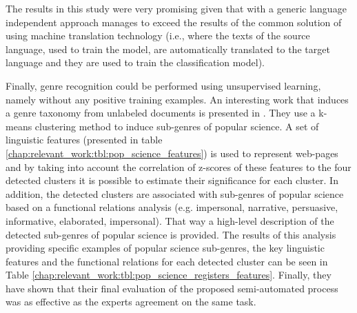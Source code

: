 \begin{itemize}
\begin{end}
The results in this study were very promising given that with a generic language independent approach manages to exceed the results of the common solution of using machine translation technology (i.e., where the texts of the  source language, used to train the model, are automatically translated to the target language and they are used to train the classification model).

Finally, genre recognition could be performed using unsupervised learning, namely without any positive training examples. An interesting work that induces a genre taxonomy from unlabeled documents is presented in \parencite{lieungnapar2017genre}. They use a k-means clustering method to induce sub-genres of popular science. A set of linguistic features (presented in table \ref{chap:relevant_work:tbl:pop_science_features}) is used to represent web-pages and by taking into account the correlation of z-scores of these features to the four detected clusters it is possible to estimate their significance for each cluster. In addition, the detected clusters are associated with sub-genres of popular science based on a functional relations analysis (e.g. impersonal, narrative, persuasive, informative, elaborated, impersonal). That way a high-level description of the detected sub-genres of popular science is provided. The results of this analysis providing specific examples of popular science sub-genres, the key linguistic features and the functional relations for each detected cluster can be seen in Table \ref{chap:relevant_work:tbl:pop_science_registers_features}. Finally, they have shown that their final evaluation of the proposed semi-automated process was as effective as the experts agreement on the same task. 


\end{end}
\end{itemize}
